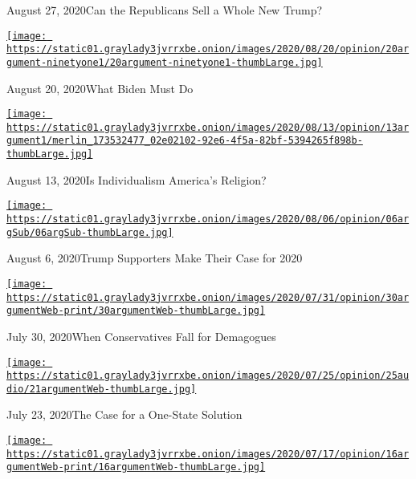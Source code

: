 August 27, 2020Can the Republicans Sell a Whole New Trump?

\href{https://www.nytimes3xbfgragh.onion/2020/08/20/opinion/the-argument-democratic-convention-biden.html?action=click\&module=audio-series-bar\&region=header\&pgtype=Article}{\texttt{[image: https://static01.graylady3jvrrxbe.onion/images/2020/08/20/opinion/20argument-ninetyone1/20argument-ninetyone1-thumbLarge.jpg]}}

August 20, 2020What Biden Must Do

\href{https://www.nytimes3xbfgragh.onion/2020/08/13/opinion/the-argument-coronavirus-catholic-covid.html?action=click\&module=audio-series-bar\&region=header\&pgtype=Article}{\texttt{[image: https://static01.graylady3jvrrxbe.onion/images/2020/08/13/opinion/13argument1/merlin\_173532477\_02e02102-92e6-4f5a-82bf-5394265f898b-thumbLarge.jpg]}}

August 13, 2020Is Individualism America's Religion?

\href{https://www.nytimes3xbfgragh.onion/2020/08/06/opinion/the-argument-trump-coronavirus-election.html?action=click\&module=audio-series-bar\&region=header\&pgtype=Article}{\texttt{[image: https://static01.graylady3jvrrxbe.onion/images/2020/08/06/opinion/06argSub/06argSub-thumbLarge.jpg]}}

August 6, 2020Trump Supporters Make Their Case for 2020

\href{https://www.nytimes3xbfgragh.onion/2020/07/30/opinion/the-argument-authoritarianism-anne-applebaum.html?action=click\&module=audio-series-bar\&region=header\&pgtype=Article}{\texttt{[image: https://static01.graylady3jvrrxbe.onion/images/2020/07/31/opinion/30argumentWeb-print/30argumentWeb-thumbLarge.jpg]}}

July 30, 2020When Conservatives Fall for Demagogues

\href{https://www.nytimes3xbfgragh.onion/2020/07/23/opinion/the-argument-israel-palestinian.html?action=click\&module=audio-series-bar\&region=header\&pgtype=Article}{\texttt{[image: https://static01.graylady3jvrrxbe.onion/images/2020/07/25/opinion/25audio/21argumentWeb-thumbLarge.jpg]}}

July 23, 2020The Case for a One-State Solution

\href{https://www.nytimes3xbfgragh.onion/2020/07/16/opinion/the-argument-tammy-duckworth.html?action=click\&module=audio-series-bar\&region=header\&pgtype=Article}{\texttt{[image: https://static01.graylady3jvrrxbe.onion/images/2020/07/17/opinion/16argumentWeb-print/16argumentWeb-thumbLarge.jpg]}}

